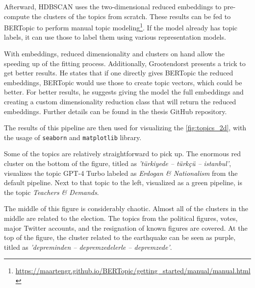 Afterward, HDBSCAN uses the two-dimensional reduced embeddings to pre-compute the clusters of 
the topics from scratch. These results can be fed to BERTopic to perform manual topic 
modeling\footnote{\url{https://maartengr.github.io/BERTopic/getting_started/manual/manual.html}}.
If the model already has topic labels, it can use those to label them using various 
representation models.

With embeddings, reduced dimensionality and clusters on hand allow the speeding up of the fitting 
process. Additionally, Grootendorst presents a trick to get better results. 
He states that if one directly gives BERTopic the reduced embeddings, BERTopic would use those 
to create topic vectors, which could be better. For better results, he suggests giving the model 
the full embeddings and creating a custom dimensionality reduction class that will return the 
reduced embeddings. Further details can be found in the thesis GitHub repository.

The results of this pipeline are then used for visualizing the \autoref{fig:topics_2d}, 
with the usage of \texttt{seaborn} and \texttt{matplotlib} library.

Some of the topics are relatively straightforward to pick up. The enormous red cluster on the 
bottom of the figure, titled as \textit{'türkiyede -- türkçü -- istanbul'}, visualizes the 
topic GPT-4 Turbo labeled as \textit{Erdogan \& Nationalism} from the default pipeline. 
Next to that topic to the left, visualized as a green pipeline, is the topic 
\textit{Teachers \& Demands}. 

The middle of this figure is considerably chaotic. Almost all of the clusters in the middle are 
related to the election. The topics from the political figures, votes, major Twitter accounts, 
and the resignation of known figures are covered. At the top of the figure, the cluster 
related to the earthquake can be seen as purple, titled as 
\textit{'depreminden -- depremzedelerle -- depremzede'}.

